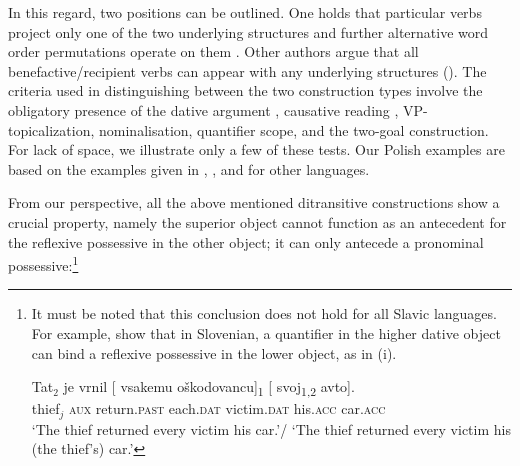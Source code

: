 \documentclass[output=paper,modfonts,nonflat
]{langsci/langscibook}
\begin{document}
\noindent In this regard, two positions can be outlined. One holds that particular verbs project only one of the two underlying structures and further alternative word order permutations operate on them \citep{dvorak2010}. Other authors argue that all benefactive/recipient verbs can appear with any underlying structures (\citealt{gracanin2006,marvinstegovec2012}). The criteria used in distinguishing between the two construction types involve the obligatory presence of the dative argument , causative reading , VP-topicalization, nominalisation, quantifier scope, and the two-goal construction. For lack of space, we illustrate only a few of these tests. Our Polish examples are based on the examples given in \cite{gracanin2006}, \cite{dvorak2010}, and \cite{marvinstegovec2012} for other languages.

\ea \label{ex:witkos:24}
	\z
\z

\ea \label{ex:witkos:25}
	\z
\z

\noindent From our perspective, all the above mentioned ditransitive constructions show a crucial property, namely the superior object cannot function as an antecedent for the reflexive possessive in the other object; it can only antecede a pronominal possessive:\footnote{\label{fn20}It must be noted that this conclusion does not hold for all Slavic languages. For example, \cite{marvinstegovec2012} show that in Slovenian, a quantifier in the higher dative object can bind a reflexive possessive in the lower object, as in (i). 

\ea
\gll Tat$_2$ je vrnil [\hspace{-2pt} vsakemu oškodovancu]\textsubscript{1} [\hspace{-2pt} svoj\textsubscript{1,2} avto].\\
thief$_j$ \textsc{aux} return.\textsc{past} {} each.\textsc{dat} victim.\textsc{dat} {} his.\textsc{acc} car.\textsc{acc}\\
\glt `The thief returned every victim his car.'/ `The thief returned every victim his (the thief's) car.'
\z}
\end{document}
